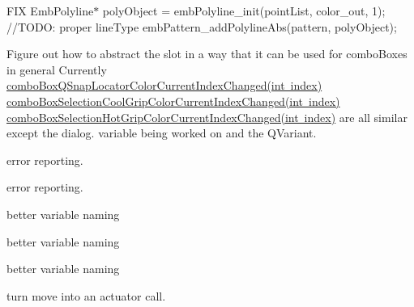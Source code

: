 \begin{DoxyRefList}
%
FIX Emb\+Polyline$\ast$ poly\+Object = emb\+Polyline\+\_\+init(point\+List, color\+\_\+out, 1); //\+TODO\+: proper line\+Type emb\+Pattern\+\_\+add\+Polyline\+Abs(pattern, poly\+Object);  
\item[Member \mbox{\hyperlink{class_settings___dialog_ac91d45dbe254b78d68efb921cbaada85}{Settings\+\_\+\+Dialog\+::combo\+Box\+QSnap\+Locator\+Color\+Current\+Index\+Changed}} (int)]\label{todo__todo000228}%
%
Figure out how to abstract the slot in a way that it can be used for combo\+Boxes in general Currently \mbox{\hyperlink{class_settings___dialog_ac91d45dbe254b78d68efb921cbaada85}{combo\+Box\+QSnap\+Locator\+Color\+Current\+Index\+Changed(int index)}} \mbox{\hyperlink{class_settings___dialog_ac341e5897023f51b858434cc55001fb3}{combo\+Box\+Selection\+Cool\+Grip\+Color\+Current\+Index\+Changed(int index)}} \mbox{\hyperlink{class_settings___dialog_af5821ecc625b7e60284c1ac11b72b362}{combo\+Box\+Selection\+Hot\+Grip\+Color\+Current\+Index\+Changed(int index)}} are all similar except the dialog. variable being worked on and the QVariant.  
\item[Member \mbox{\hyperlink{class_settings___dialog_a66e85cca98d855495cd4f845f0251630}{Settings\+\_\+\+Dialog\+::set\+\_\+label\+\_\+visibility}} (QObject $\ast$parent, const char $\ast$name, bool visibility)]\label{todo__todo000226}%
%
error reporting.  
\item[Member \mbox{\hyperlink{class_settings___dialog_a957d3b1288d49c54fb7356243aaee4ac}{Settings\+\_\+\+Dialog\+::set\+\_\+spinbox\+\_\+visibility}} (QObject $\ast$parent, const char $\ast$name, bool visibility)]\label{todo__todo000227}%
%
error reporting.  
\item[Member \mbox{\hyperlink{struct_sub_descriptor___affb2c75b7f632338f368aafab49f678d}{Sub\+Descriptor\+\_\+\+::color\+Code}} ]\label{todo__todo000235}%
%
better variable naming  
\item[Member \mbox{\hyperlink{struct_sub_descriptor___a0cfe04519ff6dab092ee7c002e55e520}{Sub\+Descriptor\+\_\+\+::some\+Int}} ]\label{todo__todo000233}%
%
better variable naming  
\item[Member \mbox{\hyperlink{struct_sub_descriptor___a6154b0f4ec7815c6d26c71852506418e}{Sub\+Descriptor\+\_\+\+::some\+Other\+Int}} ]\label{todo__todo000234}%
%
better variable naming  
\item[Member \mbox{\hyperlink{class_view_ae820c6a86f0a1908bf451f86db043489}{View\+::mouse\+Move\+Event}} (QMouse\+Event $\ast$event)]\label{todo__todo000229}%
%
turn move into an actuator call. 
\end{DoxyRefList}